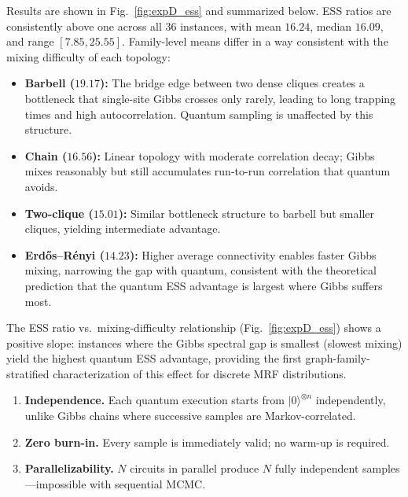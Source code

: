     Results are shown in Fig.~\ref{fig:expD_ess} and summarized below.
    ESS ratios are consistently above one across all 36 instances, with
    mean $16.24$, median $16.09$, and range $[7.85, 25.55]$.
    Family-level means differ in a way consistent with the mixing difficulty
    of each topology:
    \begin{itemize}[leftmargin=*, topsep=2pt, itemsep=2pt]
        \item \textbf{Barbell ($19.17$):} The bridge edge between two dense
        cliques creates a bottleneck that single-site Gibbs crosses only
        rarely, leading to long trapping times and high autocorrelation.
        Quantum sampling is unaffected by this structure.
        \item \textbf{Chain ($16.56$):} Linear topology with moderate
        correlation decay; Gibbs mixes reasonably but still accumulates
        run-to-run correlation that quantum avoids.
        \item \textbf{Two-clique ($15.01$):} Similar bottleneck structure
        to barbell but smaller cliques, yielding intermediate advantage.
        \item \textbf{Erd\H{o}s--R\'enyi ($14.23$):} Higher average
        connectivity enables faster Gibbs mixing, narrowing the gap with
        quantum, consistent with the theoretical prediction that the
        quantum ESS advantage is largest where Gibbs suffers most.
    \end{itemize}
    
    The ESS ratio vs.\ mixing-difficulty relationship (Fig.~\ref{fig:expD_ess})
    shows a positive slope: instances where the Gibbs spectral gap is
    smallest (slowest mixing) yield the highest quantum ESS advantage,
    providing the first graph-family-stratified characterization of this
    effect for discrete MRF distributions.
    
    \begin{enumerate}[leftmargin=*]
        \item \textbf{Independence.} Each quantum execution starts from
        $|0\rangle^{\otimes n}$ independently, unlike Gibbs chains where
        successive samples are Markov-correlated.
        \item \textbf{Zero burn-in.} Every sample is immediately valid;
        no warm-up is required.
        \item \textbf{Parallelizability.} $N$ circuits in parallel produce
        $N$ fully independent samples---impossible with sequential MCMC.
    \end{enumerate}
    
